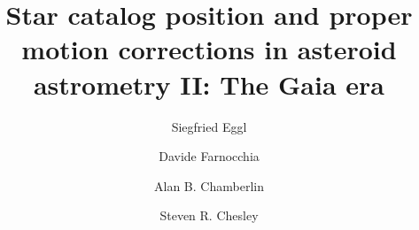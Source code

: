 \documentclass[review]{elsarticle}
\begin{document}
\begin{frontmatter}

\title{Star catalog position and proper motion corrections in
asteroid astrometry II: The Gaia era}


\author[JPL]{Siegfried Eggl}

\author[JPL]{Davide Farnocchia}
\author[JPL]{Alan B. Chamberlin}
\author[JPL]{Steven R. Chesley}


\address[JPL]{Jet Propulsion Laboratory, California Institute of Technology, 4800 Oak Grove Drive, 91101 Pasadena, CA, USA}





\end{frontmatter}
\end{document}
